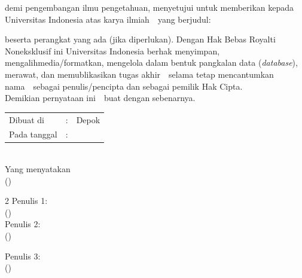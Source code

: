 \noindent demi pengembangan ilmu pengetahuan, menyetujui untuk memberikan
kepada Universitas Indonesia  atas karya ilmiah~\ifx\blank{}\fi~yang berjudul:
\begin{center}
	\judul
\end{center}
beserta perangkat yang ada (jika diperlukan). Dengan Hak Bebas Royalti
Noneksklusif ini Universitas Indonesia berhak menyimpan,
mengalihmedia/formatkan, mengelola dalam bentuk pangkalan data
(\textit{database}), merawat, dan memublikasikan tugas akhir~\ifx\blank{}\fi~selama
tetap mencantumkan nama~\ifx\blank{}\fi~sebagai penulis/pencipta dan sebagai
pemilik Hak Cipta. \\

\noindent Demikian pernyataan ini~\ifx\blank{}\fi~buat dengan sebenarnya.

\ifx\blank\npmDua\else\clearpage\fi



\begin{center}
	\vspace*{0.8cm}
	\begin{tabular}{lll}
		Dibuat di&: & Depok \\
		Pada tanggal&: & \tanggalSiapSidang \\
	\end{tabular}\\

	\vspace*{0.2cm}
	Yang menyatakan \\
	\ifx\blank\npmDua
		\vspace*{2cm}
		(\penulisSatu)
	\else
		\begin{multicols}{2}
			Penulis 1:\\
			\vspace*{2cm}
			(\penulisSatu)\\

			Penulis 2:\\
			\vspace*{2cm}
			(\penulisDua)\\
		\end{multicols}
	\fi
	\ifx\blank\npmTiga\else
		\vspace*{0.2cm}
		Penulis 3:\\
		\vspace*{2cm}
		(\penulisTiga)
	\fi
\end{center}

\newpage
